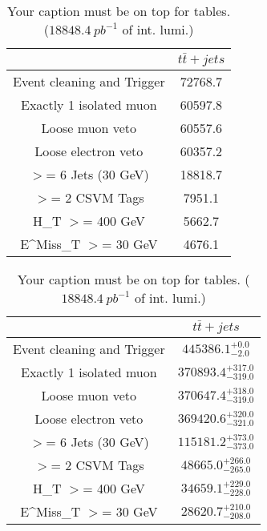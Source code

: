 \documentclass{article}
\begin{document}
\begin{table}
\caption{Your caption must be on top for tables. ($18848.4~pb^{-1}$ of int. lumi.)}
\label{tab:}
\centering
\begin{tabular}{|c|c|}
\toprule
&$t\bar{t}+jets$	\\

\midrule
Event cleaning and Trigger&	72768.7	\\

Exactly 1 isolated muon&	60597.8	\\

Loose muon veto&	60557.6	\\

Loose electron veto&	60357.2	\\

$>$= 6 Jets (30 GeV)&	18818.7	\\

$>$= 2 CSVM Tags&	7951.1	\\

H_{T} $>$=  400 GeV&	5662.7	\\

E^{Miss}_{T} $>$=  30 GeV&	4676.1	\\

\bottomrule
\end{tabular}
\end{table}
\begin{table}
\caption{Your caption must be on top for tables. ($18848.4~pb^{-1}$ of int. lumi.)}
\label{tab:}
\centering
\begin{tabular}{|c|c|}
\toprule
&$t\bar{t}+jets$	\\

\midrule
Event cleaning and Trigger&	$445386.1^{+0.0}_{-2.0}$	\\

Exactly 1 isolated muon&	$370893.4^{+317.0}_{-319.0}$	\\

Loose muon veto&	$370647.4^{+318.0}_{-319.0}$	\\

Loose electron veto&	$369420.6^{+320.0}_{-321.0}$	\\

$>$= 6 Jets (30 GeV)&	$115181.2^{+373.0}_{-373.0}$	\\

$>$= 2 CSVM Tags&	$48665.0^{+266.0}_{-265.0}$	\\

H_{T} $>$=  400 GeV&	$34659.1^{+229.0}_{-228.0}$	\\

E^{Miss}_{T} $>$=  30 GeV&	$28620.7^{+210.0}_{-208.0}$	\\

\bottomrule
\end{tabular}
\end{table}
\end{document}
